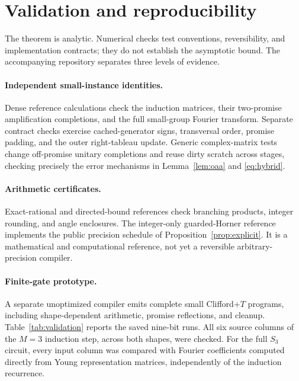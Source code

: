\documentclass[11pt]{article}
\theoremstyle{definition}
\begin{document}
\section{Validation and reproducibility}\label{sec:validation}

The theorem is analytic. Numerical checks test conventions, reversibility,
and implementation contracts; they do not establish the asymptotic bound.
The accompanying repository separates three levels of evidence.

\paragraph{Independent small-instance identities.}
Dense reference calculations check the induction matrices, their
two-promise amplification completions, and the full small-group Fourier
transform. Separate contract checks exercise cached-generator signs,
transversal order, promise padding, and the outer right-tableau update.
Generic complex-matrix tests change off-promise unitary completions and
reuse dirty scratch across stages, checking precisely the error mechanisms
in Lemma~\ref{lem:oaa} and \eqref{eq:hybrid}.

\paragraph{Arithmetic certificates.}
Exact-rational and directed-bound references check branching products,
integer rounding, and angle enclosures. The integer-only guarded-Horner
reference implements the public precision schedule of
Proposition~\ref{prop:explicit}. It is a mathematical and computational
reference, not yet a reversible arbitrary-precision compiler.

\paragraph{Finite-gate prototype.}
A separate unoptimized compiler emits complete small Clifford+$T$
programs, including shape-dependent arithmetic, promise reflections,
and cleanup. Table~\ref{tab:validation} reports the saved nine-bit runs.
All six source columns of the $M=3$ induction step, across both shapes,
were checked. For the full $S_3$ circuit, every input column was compared
with Fourier coefficients computed directly from Young representation
matrices, independently of the induction recurrence.
\end{document}
